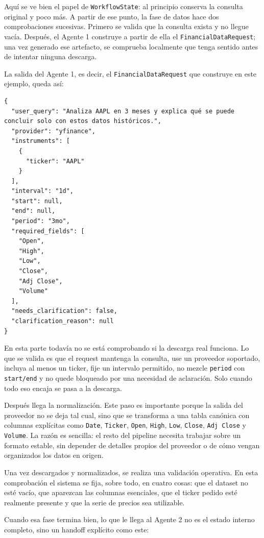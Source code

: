 Aqu\'i se ve bien el papel de \texttt{WorkflowState}: al principio conserva la
consulta original y poco m\'as. A partir de ese punto, la fase de datos hace
dos comprobaciones sucesivas. Primero se valida que la consulta exista y no
llegue vac\'ia. Despu\'es, el Agente 1 construye a partir de ella el
\texttt{FinancialDataRequest}; una vez generado ese artefacto, se comprueba
localmente que tenga sentido antes de intentar ninguna descarga.

La salida del Agente 1, es decir, el \texttt{FinancialDataRequest} que construye en este ejemplo, queda as\'i:

\begin{lstlisting}[style=traceblock]
{
  "user_query": "Analiza AAPL en 3 meses y explica qué se puede concluir solo con estos datos históricos.",
  "provider": "yfinance",
  "instruments": [
    {
      "ticker": "AAPL"
    }
  ],
  "interval": "1d",
  "start": null,
  "end": null,
  "period": "3mo",
  "required_fields": [
    "Open",
    "High",
    "Low",
    "Close",
    "Adj Close",
    "Volume"
  ],
  "needs_clarification": false,
  "clarification_reason": null
}
\end{lstlisting}

En esta parte todav\'ia no se est\'a comprobando si la descarga real funciona. Lo que se valida es que el request mantenga la consulta, use un proveedor
soportado, incluya al menos un ticker, fije un intervalo permitido, no mezcle \texttt{period} con \texttt{start/end} y no quede bloqueado por una necesidad
de aclaraci\'on. Solo cuando todo eso encaja se pasa a la descarga.

Despu\'es llega la normalizaci\'on. Este paso es importante porque la salida del proveedor no se deja tal cual, sino que se transforma a una tabla can\'onica
con columnas expl\'icitas como \texttt{Date}, \texttt{Ticker}, \texttt{Open}, \texttt{High}, \texttt{Low}, \texttt{Close}, \texttt{Adj Close} y \texttt{Volume}. 
La raz\'on es sencilla: el resto del pipeline necesita trabajar sobre un formato estable, sin depender de detalles propios del proveedor o de c\'omo vengan 
organizados los datos en origen.

Una vez descargados y normalizados, se realiza una validaci\'on operativa. En esta comprobaci\'on el sistema se fija, sobre todo, en cuatro cosas: que el
dataset no est\'e vac\'io, que aparezcan las columnas esenciales, que el ticker pedido est\'e realmente presente y que la serie de precios sea utilizable.

Cuando esa fase termina bien, lo que le llega al Agente 2 no es el estado interno completo, sino un handoff expl\'icito como este:

